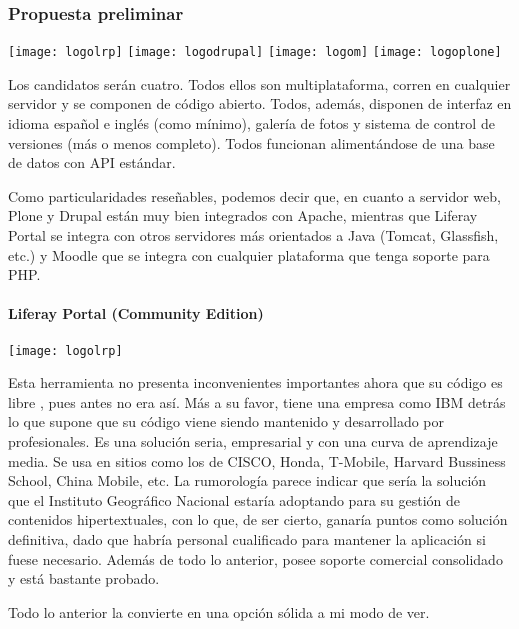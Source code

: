 \subsubsection{Propuesta preliminar}

\begin{center}
\texttt{[image: logolrp]}
\texttt{[image: logodrupal]}
\texttt{[image: logom]}
\texttt{[image: logoplone]}
\end{center}

\par Los candidatos serán cuatro. Todos ellos son multiplataforma, corren en cualquier servidor y se componen de código abierto. Todos, además, disponen de interfaz en idioma español e inglés (como mínimo), galería de fotos y sistema de control de versiones (más o menos completo). Todos funcionan alimentándose de una base de datos con API estándar.
\par Como particularidades reseñables, podemos decir que, en cuanto a servidor web, Plone y Drupal están muy bien integrados con Apache, mientras que Liferay Portal se integra con otros servidores más orientados a Java (Tomcat, Glassfish, etc.) y Moodle que se integra con cualquier plataforma que tenga soporte para PHP.

\paragraph{Liferay Portal (Community Edition)}
\texttt{[image: logolrp]}
\par Esta herramienta no presenta inconvenientes importantes ahora que su código es libre \cite{references:liferaylicense}, pues antes no era así. Más a su favor, tiene una empresa como IBM detrás lo que supone que su código viene siendo mantenido y desarrollado por profesionales. Es una solución seria, empresarial y con una curva de aprendizaje media. Se usa en sitios como los de CISCO, Honda, T-Mobile, Harvard Bussiness School, China Mobile, etc.
La rumorología parece indicar que sería la solución que el Instituto Geográfico Nacional estaría adoptando para su gestión de contenidos hipertextuales, con lo que, de ser cierto, ganaría puntos como solución definitiva, dado que habría personal cualificado para mantener la aplicación si fuese necesario.
Además de todo lo anterior, posee soporte comercial consolidado y está bastante probado.
\par Todo lo anterior la convierte en una opción sólida a mi modo de ver.

